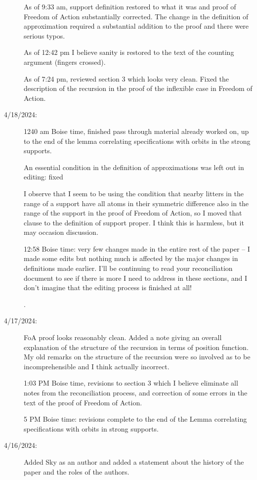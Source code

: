 \documentclass[112pt]{article}
\begin{document}
\begin{description}
As of 9:33 am, support definition restored to what it was and proof of Freedom of Action substantially corrected.  The change in the definition of approximation required a substantial addition to the proof and there were serious typos.

As of 12:42 pm I believe sanity is restored to the text of the counting argument (fingers crossed).

As of 7:24 pm, reviewed section 3 which looks very clean.  Fixed the description of the recursion in the proof of the inflexible case in Freedom of Action.

\item[4/18/2024:]  1240 am Boise time, finished pass through material already worked on, up to the end of the lemma
correlating specifications with orbits in the strong supports.

An essential condition in the definition of approximations was left out in editing:  fixed

I observe that I seem to be using the condition that nearby litters in the range of a support have all atoms in their symmetric difference also in the range of the support in the proof of Freedom of Action, so I moved that clause to the definition of support proper.  I think this is harmless, but it may occasion discussion.

12:58 Boise time:  very few changes made in the entire rest of the paper -- I made some edits but nothing much is affected by the major changes in definitions made earlier.  I'll be continuing to read your reconciliation document to see if there is more I need to address in these sections, and I don't imagine that the editing process is finished at all!

.
\item[4/17/2024:]  FoA proof looks reasonably clean.  Added a note giving an overall explanation of the structure of the recursion in terms of position function.  My old remarks on the structure of the recursion were so involved as to be incomprehensible and I think actually incorrect.

1:03 PM Boise time, revisions to section 3 which I believe eliminate all notes from the reconciliation process, and correction of some errors in the text of the proof of Freedom of Action.

5 PM Boise time:  revisions complete to the end of the Lemma correlating specifications with orbits in strong supports.


\item[4/16/2024:]  Added Sky as an author and added a statement about the history of the paper and the roles of the authors.


\end{description}
\end{document}
